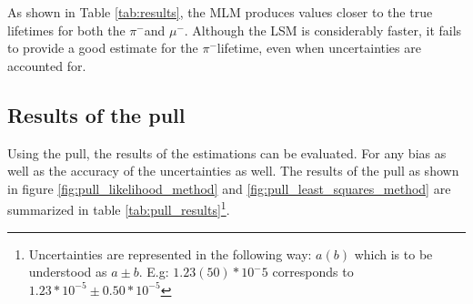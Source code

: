 \documentclass[11pt, a4paper, oneside]{book}
\newcommand{\pion}{$\pi^{-}$}
\newcommand{\muon}{$\mu^{-}$}
\begin{document}
As shown in Table \ref{tab:results}, the MLM produces values closer to the true lifetimes for both the \pion and \muon. Although the LSM is considerably faster, it fails to provide a good estimate for the \pion lifetime, even when uncertainties are accounted for.





\subsection{Results of the pull} 

Using the pull, the results of the estimations can be evaluated. For any bias as well as the accuracy of the uncertainties as well. The results of the pull as shown in figure \ref{fig:pull_likelihood_method} and \ref{fig:pull_least_squares_method} are summarized in table \ref{tab:pull_results}\footnote{Uncertainties are represented in the following way: $a(b)$ which is to be understood as $a \pm b$. E.g: $1.23(50)*10^-5$ corresponds to $1.23*10^{-5} \pm 0.50 * 10^{-5}$}.
\end{document}
